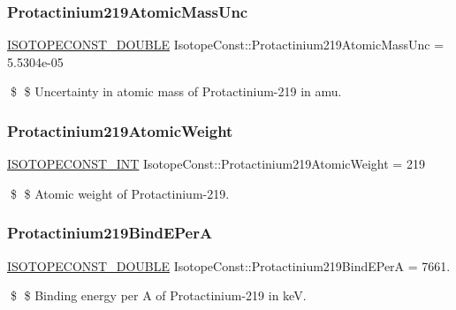 \subsubsection{\texorpdfstring{Protactinium219\+Atomic\+Mass\+Unc}{Protactinium219AtomicMassUnc}}
{\footnotesize\ttfamily \mbox{\hyperlink{group___isotope_const-_macros_ga8f45a7272ce02c0b4c65c44636ed719a}{I\+S\+O\+T\+O\+P\+E\+C\+O\+N\+S\+T\+\_\+\+D\+O\+U\+B\+LE}} Isotope\+Const\+::\+Protactinium219\+Atomic\+Mass\+Unc = 5.\+5304e-\/05}

\$ \$ Uncertainty in atomic mass of Protactinium-\/219 in amu. \mbox{\label{group___isotope_const-_protactinium-_pa219_ga8e26353dba5f7053a903b0a6f184557c}} 
\subsubsection{\texorpdfstring{Protactinium219\+Atomic\+Weight}{Protactinium219AtomicWeight}}
{\footnotesize\ttfamily \mbox{\hyperlink{group___isotope_const-_macros_ga5f18360b3e99483a35c32d789e62621c}{I\+S\+O\+T\+O\+P\+E\+C\+O\+N\+S\+T\+\_\+\+I\+NT}} Isotope\+Const\+::\+Protactinium219\+Atomic\+Weight = 219}

\$ \$ Atomic weight of Protactinium-\/219. \mbox{\label{group___isotope_const-_protactinium-_pa219_ga4aac4f84506e01b51272e010e184b018}} 
\subsubsection{\texorpdfstring{Protactinium219\+Bind\+E\+PerA}{Protactinium219BindEPerA}}
{\footnotesize\ttfamily \mbox{\hyperlink{group___isotope_const-_macros_ga8f45a7272ce02c0b4c65c44636ed719a}{I\+S\+O\+T\+O\+P\+E\+C\+O\+N\+S\+T\+\_\+\+D\+O\+U\+B\+LE}} Isotope\+Const\+::\+Protactinium219\+Bind\+E\+PerA = 7661.}

\$ \$ Binding energy per A of Protactinium-\/219 in keV. \mbox{\label{group___isotope_const-_protactinium-_pa219_ga706fc8ea10a1dd78fbe6ef092d186d63}} 

